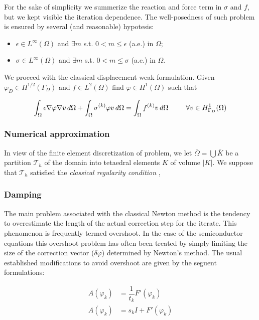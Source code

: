 For the sake of simplicity we summerize the reaction and force term in $\sigma$ and $f$, but we kept visible the iteration dependence.
The well-posedness of such problem is ensured by several (and reasonable) hypotesis:
\begin{itemize}
\item $\epsilon \in L^{\infty}(\Omega)$ and $\exists m$ s.t. $0 < m \leq \epsilon$ (a.e.) in $\Omega$;
\item  $\sigma \in L^{\infty}(\Omega)$ and $\exists m$ s.t. $0 < m \leq \sigma$ (a.e.) in $\Omega$.
\end{itemize}

We proceed with the classical displacement weak formulation.
Given $\varphi_D \in H^{1/2}(\Gamma_D)$ and $f \in L^2(\Omega)$ find $\varphi \in H^1(\Omega)$ such that 

\begin{equation}
\int_{\Omega} \epsilon \nabla \varphi \nabla v \, d\Omega + \int_{\Omega} \sigma^{(k)}\varphi v \, d\Omega = \int_{\Omega} f^{(k)}v \, d\Omega \psp{15} \forall v \in H^1_{\Gamma_D}(\Omega)
\end{equation}

\subsubsection{Numerical approximation}
In view of the finite element discretization of problem, we let $\bar{\Omega} = \bigcup \bar{K}$ be a partition $\mathcal{T}_h$ of the domain into tetaedral elements $K$ of volume $|K|$.
 We suppose that $\mathcal{T}_h$ satisfied the \textit{classical regularity condition} \citep{quarteroni:modnum},
  
\subsubsection{Damping}
The main problem associated with the classical Newton method is the tendency to overestimate the length of the actual correction step for the iterate. This phenomenon is frequently termed overshoot. In the case of the semiconductor equations this overshoot problem has often been treated by simply limiting the size of the correction vector ($\delta \varphi$) determined by Newton's method. The usual established modifications to avoid overshoot are given by the seguent formulations:


\begin{align}
A(\varphi_k)&=\dfrac{1}{t_k}F'(\varphi_k) \label{eq: NLP mod used} \\
A(\varphi_k)&=s_kI+F'(\varphi_k) \label{eq: NLP mod not used}
\end{align}

